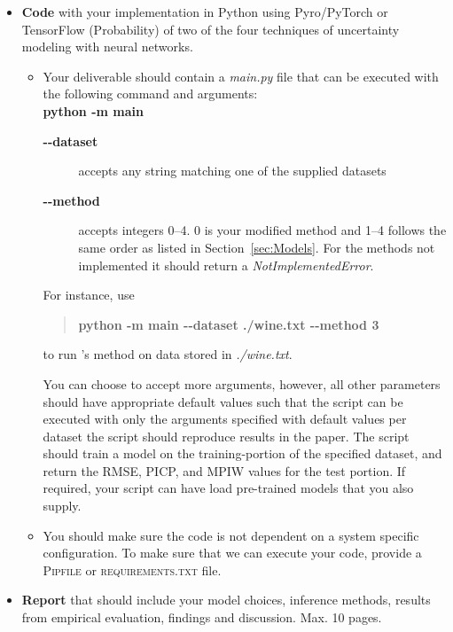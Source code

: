 \documentclass[a4paper, 12pt]{article}
\begin{document}
\begin{itemize}
    \item \textbf{Code} with your implementation in Python using Pyro/PyTorch or TensorFlow
                        (Probability) of two of the four techniques of uncertainty modeling with
                        neural networks.
        \begin{itemize}
            \item Your deliverable should contain a \emph{main.py} file that can be executed with the
                  following command and arguments:\\
                  \textbf{python -m main}
                  \begin{description}
                      \item[\textbf{-{-}dataset}] accepts any string matching one of the supplied
                                                  datasets
                      \item[\textbf{-{-}method}] accepts integers 0--4. 0 is your modified method
                        and 1--4 follows the same order as listed in Section~\ref{sec:Models}. For
                        the methods not implemented it should return a \emph{NotImplementedError}.
                  \end{description}
                  For instance, use
                  \begin{quotation}
                      \textbf{python -m main -{-}dataset ./wine.txt -{-}method 3}
                  \end{quotation}
                  to run \citet{NEURIPS2019_118921ef}'s method on data stored in \emph{./wine.txt}.

                  You can choose to accept more arguments, however, all other parameters should have
                  appropriate default values such that the script can be executed with only the
                  arguments specified with default values per dataset the script should reproduce
                  results in the paper. The script should train a model on the training-portion of
                  the specified dataset, and return the RMSE, PICP, and MPIW values for the test
                  portion. If required, your script can have load pre-trained models that you also
                  supply.
            \item You should make sure the code is not dependent on a system specific configuration. To make sure that we can execute your code, provide a \textsc{Pipfile} or \textsc{requirements.txt} file.
        \end{itemize}
    \item \textbf{Report} that should include your model choices, inference methods, results from
                          empirical evaluation, findings and discussion. Max. 10 pages.
\end{itemize}
\end{document}
